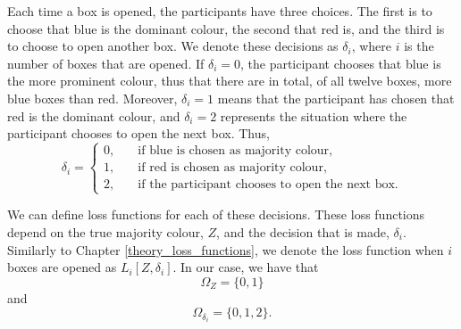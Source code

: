 
Each time a box is opened, the participants have three choices. The first is to choose that blue is the dominant colour, the second that red is, and the third is to choose to open another box. We denote these decisions as $\delta_i$, where $i$ is the number of boxes that are opened. If $\delta_i = 0$, the participant chooses that blue is the more prominent colour, thus that there are in total, of all twelve boxes, more blue boxes than red. Moreover, $\delta_i=1$ means that the participant has chosen that red is the dominant colour, and $\delta_i=2$ represents the situation where the participant chooses to open the next box. Thus,
\begin{equation}
\label{def_of_delta}
    \delta_i =
    \begin{cases}
        0,& \quad \text{if blue is chosen as majority colour,}\\
        1,& \quad \text{if red is chosen as majority colour,}\\
        2,& \quad \text{if the participant chooses to open the next box.}
    \end{cases}
\end{equation}

We can define loss functions for each of these decisions. These loss functions depend on the true majority colour, $Z$, and the decision that is made, $\delta_i$. Similarly to Chapter \ref{theory_loss_functions}, we denote the loss function when $i$ boxes are opened as $L_i[Z,\delta_i]$. In our case, we have that 
\begin{equation*}
    \Omega_Z = \{0,1\}
\end{equation*}
and 
\begin{equation*}
    \Omega_{\delta_i}=\{0,1,2\}.
\end{equation*}


